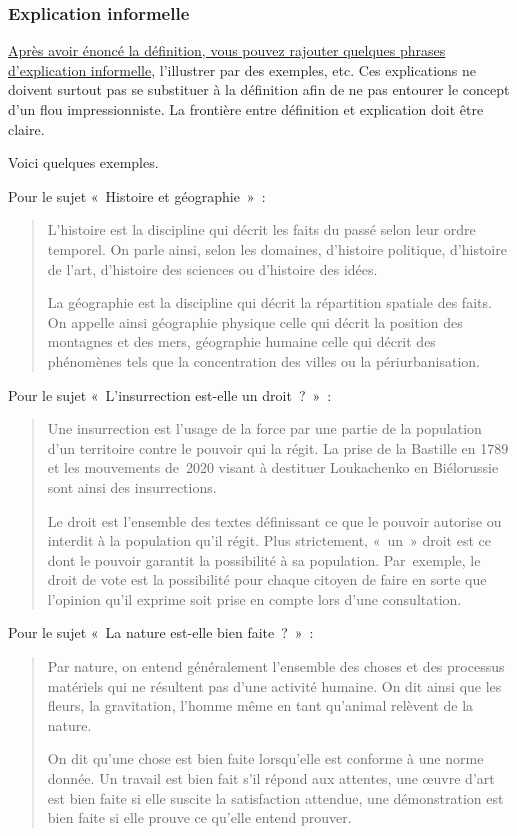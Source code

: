 \documentclass[a4paper,12pt]{article}
\begin{document}
\subsubsection{Explication informelle}
\label{sec:org82eebcd}

\uline{Après avoir énoncé la définition, vous pouvez rajouter quelques phrases
d'explication informelle}, l'illustrer par des exemples, etc. Ces
explications ne doivent surtout pas se substituer à la définition afin
de ne pas entourer le concept d'un flou impressionniste. La frontière
entre définition et explication doit être claire.

Voici quelques exemples.

Pour le sujet « Histoire et géographie » : 
\begin{quotation}
L'histoire est la discipline qui décrit les faits
du passé selon leur ordre temporel. On parle
ainsi, selon les domaines, d'histoire politique,
d'histoire de l'art, d'histoire des sciences ou d'histoire des idées.

La géographie est la discipline qui décrit la
répartition spatiale des faits. On appelle ainsi
géographie physique celle qui décrit la position des montagnes et des
mers, géographie humaine celle qui décrit des phénomènes tels que la
concentration des villes ou la périurbanisation.
\end{quotation}

Pour le sujet « L'insurrection est-elle un droit ? » : 
\begin{quotation}
Une insurrection est l'usage de la force par une
partie de la population d'un territoire contre le pouvoir qui la régit.
La prise de la Bastille en 1789 et les mouvements
de 2020 visant à destituer Loukachenko en Biélorussie sont ainsi des
insurrections.

Le droit est l'ensemble des textes définissant ce
que le pouvoir autorise ou interdit à la population qu'il régit. Plus
strictement, « un » droit est ce dont le pouvoir garantit la possibilité
à sa population. Par exemple, le droit de vote
est la possibilité pour chaque citoyen de faire en sorte que l'opinion
qu'il exprime soit prise en compte lors d'une consultation.
\end{quotation}

Pour le sujet « La nature est-elle bien faite ? » : 
\begin{quotation}
Par nature, on entend généralement l'ensemble des
choses et des processus matériels qui ne résultent pas d'une activité
humaine. On dit ainsi que les fleurs, la
gravitation, l'homme même en tant qu'animal relèvent de la nature.

On dit qu'une chose est bien faite lorsqu'elle est
conforme à une norme donnée. Un travail est bien
fait s'il répond aux attentes, une œuvre d'art
est bien faite si elle suscite la satisfaction attendue, une
démonstration est bien faite si elle prouve ce qu'elle entend prouver.
\end{quotation}
\end{document}
